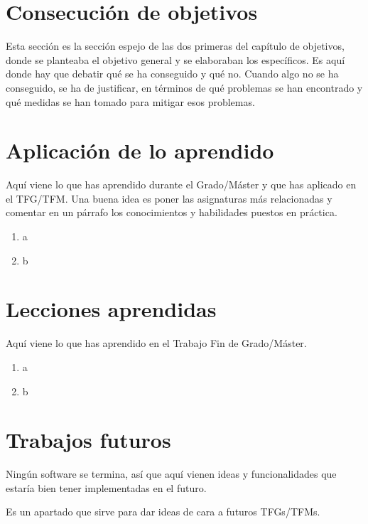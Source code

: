\documentclass[a4paper, 17pt]{book}
\begin{document}
\section{Consecución de objetivos}
\label{sec:consecucion-objetivos}

Esta sección es la sección espejo de las dos primeras del capítulo de objetivos,
donde se planteaba el objetivo general y se elaboraban los específicos.
\bigbreak
Es aquí donde hay que debatir qué se ha conseguido y qué no. Cuando algo no
se ha conseguido, se ha de justificar, en términos de qué problemas se han
encontrado y qué medidas se han tomado para mitigar esos problemas.


\section{Aplicación de lo aprendido}
\label{sec:aplicacion}

Aquí viene lo que has aprendido durante el Grado/Máster y que has aplicado
en el TFG/TFM. Una buena idea es poner las asignaturas más relacionadas y
comentar en un párrafo los conocimientos y habilidades puestos en práctica.

\begin{enumerate}
  \item a
  \item b
\end{enumerate}


\section{Lecciones aprendidas}
\label{sec:lecciones_aprendidas}

Aquí viene lo que has aprendido en el Trabajo Fin de Grado/Máster.

\begin{enumerate}
  \item a
  \item b
\end{enumerate}


\section{Trabajos futuros}
\label{sec:trabajos_futuros}

Ningún software se termina, así que aquí vienen ideas y funcionalidades
que estaría bien tener implementadas en el futuro.

Es un apartado que sirve para dar ideas de cara a futuros TFGs/TFMs.
\end{document}
